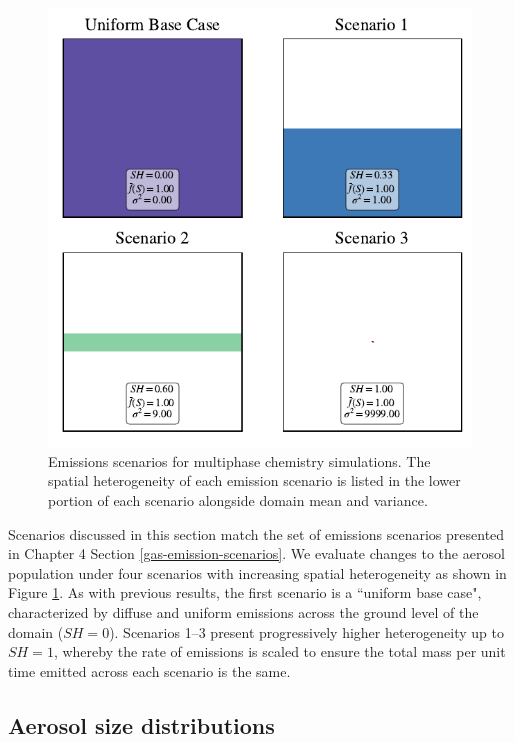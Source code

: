 \begin{figure}[t]
  \centering
    \includegraphics[width=.7\textwidth]{figures/SH-scenarios-main-runs.pdf}
    \caption{Emissions scenarios for multiphase chemistry simulations. The spatial heterogeneity of each emission scenario is listed in the lower portion of each scenario alongside domain mean and variance.
}
    \label{fig:aerosol-emission-scenarios}
\end{figure}

Scenarios discussed in this section match the set of emissions scenarios presented in Chapter 4 Section \ref{gas-emission-scenarios}. We evaluate changes to the aerosol population under four scenarios with increasing spatial heterogeneity as shown in Figure \ref{fig:aerosol-emission-scenarios}. As with previous results, the first scenario is a ``uniform base case", characterized by diffuse and uniform emissions across the ground level of the domain ($SH=0$). Scenarios 1--3 present progressively higher heterogeneity up to $SH=1$, whereby the rate of emissions is scaled to ensure the total mass per unit time emitted across each scenario is the same.

\subsection{Aerosol size distributions}

